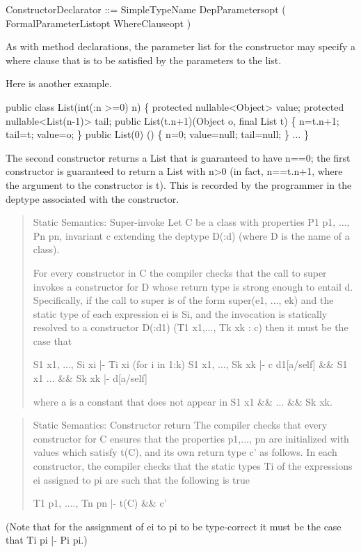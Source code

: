 \begin{x10}
ConstructorDeclarator ::=  
  SimpleTypeName DepParametersopt 
 ( FormalParameterListopt WhereClauseopt )
\end{x10}

As with method declarations, the parameter list for the constructor
may specify a where clause that is to be satisfied by the parameters
to the list.

\begin{example}
Here is another example.
\begin{x10}
public class List(int(:n >=0) n) \{
 protected nullable<Object>   value;
 protected nullable<List(n-1)>  tail;
 public List(t.n+1)(Object o, final List t) \{
     n=t.n+1;
     tail=t;
     value=o;
 \}
 public List(0) () \{
     n=0;
     value=null;
     tail=null;
 \}
 ...
\}
\end{x10}
The second constructor returns a {\cf List} that is guaranteed to have {\cf n==0};
the first constructor is guaranteed to return a List with {\cf n>0}
(in fact, {\cf n==t.n+1}, where the argument to the constructor is {\cf t}). 
This is recorded by the programmer in the deptype associated with the
constructor.
\end{example}

\begin{quotation}
{\sc Static Semantics:  Super-invoke}
   Let {\cf C} be a class with properties {\cf P1 p1, ..., Pn pn}, invariant {\cf c}
   extending the deptype {\cf D(:d)} (where {\cf D} is the name of a class).

   For every constructor in {\cf C} the compiler checks that the call to
   super invokes a constructor for D whose return type is strong enough
   to entail d. Specifically, if the call to super is of the form 
     {\cf      super(e1, ..., ek)}
   and the static type of each expression ei is Si, and the invocation
   is statically resolved to a constructor
{\cf       D(:d1) (T1 x1,..., Tk xk : c)}
   then it must be the case that 
   \begin{x10}
S1 x1, ..., Si xi |- Ti xi  (for i in 1:k)
S1 x1, ..., Sk xk |- c  
d1[a/self] \&\& S1 x1 ... \&\& Sk xk |- d[a/self]      
   \end{x10}
\noindent   where {\cf a} is a constant that does not appear in 
{\cf S1 x1 \&\& ... \&\& Sk xk}.
  
\end{quotation}

\begin{quotation}
{\cf Static Semantics: Constructor return}
   The compiler checks that every constructor for {\cf C} ensures that
   the properties {\cf p1,..., pn} are initialized with values which satisfy
   {\cf t(C)}, and its own return type {\cf c'} as follows.  In each constructor, the
   compiler checks that the static types {\cf Ti} of the expressions {\cf ei}
   assigned to pi are such that the following is true
   \begin{x10}
    T1 p1, ...., Tn pn |- t(C) \&\& c'     
   \end{x10}
\end{quotation}
(Note that for the assignment of ei to pi to be type-correct it must be the
    case that Ti pi |- Pi pi.) 


